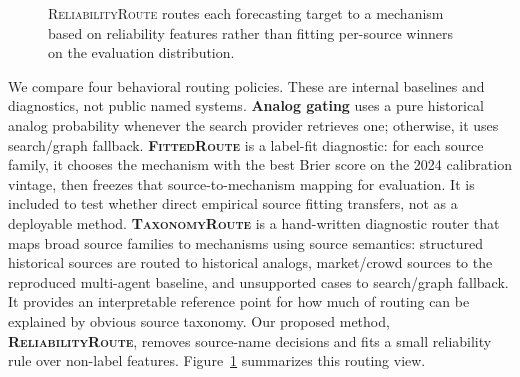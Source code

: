 \documentclass{article}
\newcommand{\tax}{\textsc{TaxonomyRoute}}
\newcommand{\rel}{\textsc{ReliabilityRoute}}
\newcommand{\fitroute}{\textsc{FittedRoute}}
\begin{document}
\begin{figure}[t]
\centering
{}
\caption{\rel{} routes each forecasting target to a mechanism based on reliability features rather than fitting per-source winners on the evaluation distribution.}
\label{fig:pipeline}
\end{figure}

We compare four behavioral routing policies. These are internal baselines and diagnostics, not public named systems. \textbf{Analog gating} uses a pure historical analog probability whenever the search provider retrieves one; otherwise, it uses search/graph fallback. \textbf{\fitroute{}} is a label-fit diagnostic: for each source family, it chooses the mechanism with the best Brier score on the 2024 calibration vintage, then freezes that source-to-mechanism mapping for evaluation. It is included to test whether direct empirical source fitting transfers, not as a deployable method. \textbf{\tax{}} is a hand-written diagnostic router that maps broad source families to mechanisms using source semantics: structured historical sources are routed to historical analogs, market/crowd sources to the reproduced multi-agent baseline, and unsupported cases to search/graph fallback. It provides an interpretable reference point for how much of routing can be explained by obvious source taxonomy. Our proposed method, \textbf{\rel{}}, removes source-name decisions and fits a small reliability rule over non-label features. Figure~\ref{fig:pipeline} summarizes this routing view.
\end{document}

